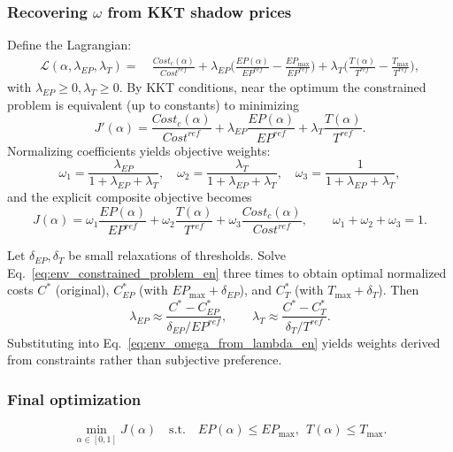 \documentclass{mcmthesis}
\begin{document}
\subsubsection*{Recovering $\omega$ from KKT shadow prices}
Define the Lagrangian:
\begin{align}
\mathcal{L}(\alpha,\lambda_{EP},\lambda_T)
=&\ \frac{Cost_c(\alpha)}{Cost^{ref}}
+\lambda_{EP}\Big(\frac{EP(\alpha)}{EP^{ref}}-\frac{EP_{\max}}{EP^{ref}}\Big)
+\lambda_T\Big(\frac{T(\alpha)}{T^{ref}}-\frac{T_{\max}}{T^{ref}}\Big),
\label{eq:env_Lagrangian_en}
\end{align}
with $\lambda_{EP}\ge 0,\lambda_T\ge 0$. By KKT conditions, near the optimum the constrained problem is equivalent (up to constants) to minimizing
\begin{equation}
J'(\alpha)=
\frac{Cost_c(\alpha)}{Cost^{ref}}
+\lambda_{EP}\frac{EP(\alpha)}{EP^{ref}}
+\lambda_T\frac{T(\alpha)}{T^{ref}}.
\label{eq:env_Jprime_en}
\end{equation}
Normalizing coefficients yields objective weights:
\begin{equation}
\omega_1=\frac{\lambda_{EP}}{1+\lambda_{EP}+\lambda_T},\quad
\omega_2=\frac{\lambda_T}{1+\lambda_{EP}+\lambda_T},\quad
\omega_3=\frac{1}{1+\lambda_{EP}+\lambda_T},
\label{eq:env_omega_from_lambda_en}
\end{equation}
and the explicit composite objective becomes
\begin{equation}
J(\alpha)=
\omega_1\frac{EP(\alpha)}{EP^{ref}}
+\omega_2\frac{T(\alpha)}{T^{ref}}
+\omega_3\frac{Cost_c(\alpha)}{Cost^{ref}},
\qquad \omega_1+\omega_2+\omega_3=1.
\label{eq:env_J_alpha_en}
\end{equation}

Let $\delta_{EP},\delta_T$ be small relaxations of thresholds. Solve Eq.~\eqref{eq:env_constrained_problem_en} three times to obtain optimal normalized costs $C^*$ (original), $C_{EP}^*$ (with $EP_{\max}+\delta_{EP}$), and $C_T^*$ (with $T_{\max}+\delta_T$). Then
\begin{equation}
\lambda_{EP}\approx \frac{C^*-C_{EP}^*}{\delta_{EP}/EP^{ref}},
\qquad
\lambda_T\approx \frac{C^*-C_T^*}{\delta_T/T^{ref}}.
\label{eq:env_lambda_fd_en}
\end{equation}
Substituting into Eq.~\eqref{eq:env_omega_from_lambda_en} yields weights derived from constraints rather than subjective preference.

\subsubsection*{Final optimization}
\begin{equation}
\min_{\alpha\in[0,1]} J(\alpha)
\quad \text{s.t.}\quad
EP(\alpha)\le EP_{\max},\ \ T(\alpha)\le T_{\max}.
\label{eq:env_final_opt_en}
\end{equation}
\end{document}
